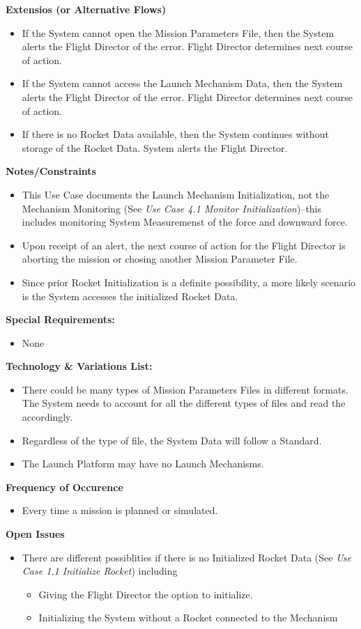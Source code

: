 \documentclass[letterpaper]{article}
\begin{document}
\textbf{Extensios (or Alternative Flows)}
\begin{itemize}
\item[2a.]If the System cannot open the Mission Parameters File, then
the System alerts the Flight Director of the error.  Flight Director
determines next course of action.
\item [4a.]If the System cannot access the Launch Mechanism Data, then
the System alerts the Flight Director of the error.  Flight Director
determines next course of action.
\item[6a.,7a.]If there is no Rocket Data available, then the System
continues without storage of the Rocket Data.  System alerts the
Flight Director.
\end{itemize}
\textbf{Notes/Constraints}
\begin{itemize}
\item[*a.]This Use Case documents the Launch Mechanism Initialization,
not the Mechanism Monitoring (See \textit{Use Case 4.1 Monitor
Initialization})--this includes monitoring System Measuremenst of the
force and downward force.
\item[*.b]Upon receipt of an alert, the next course of action for the
Flight Director is aborting the mission or chosing another Mission
Parameter File.
\item[6b.,7b.]Since prior Rocket Initialization is a definite
possibility, a more likely scenario is the System accesses the
initialized Rocket Data.
\end{itemize}
\textbf{Special Requirements:}
\begin{itemize}
\item None
\end{itemize}
\textbf{Technology \& Variations List:}
\begin{itemize}
\item There could be many types of Mission Parameters Files in
different formats.  The System needs to account for all the different
types of files and read the accordingly.
\item Regardless of the type of file, the System Data will follow a
Standard.
\item The Launch Platform may have no Launch Mechanisms.
\end{itemize}
\textbf{Frequency of Occurence}
\begin{itemize}
\item Every time a mission is planned or simulated.
\end{itemize}
\textbf{Open Issues}
\begin{itemize}
\item [6c.,7c.]There are different possiblities if there is no
Initialized Rocket Data (See \textit{Use Case 1.1 Initialize
Rocket}) including
\begin{itemize}
\item Giving the Flight Director the option to initialize.
\item Initializing the System without a Rocket connected to the
Mechanism
\end{itemize}
\end{itemize}
\end{document}
